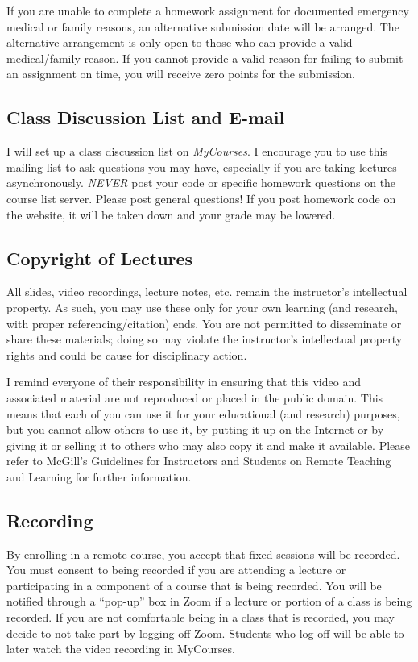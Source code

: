 \documentclass[11pt]{article}
\begin{document}
If you are unable to complete a homework assignment for documented emergency medical or family reasons, an alternative submission date will be arranged. The alternative arrangement is only open to those who can provide a valid medical/family reason. If you cannot provide a valid reason for failing to submit an assignment on time, you will receive zero points for the submission.

\subsection*{Class Discussion List and E-mail}

I will set up a class discussion list on \emph{MyCourses}. I encourage
you to use this mailing list to ask questions you may have, especially if you are taking lectures asynchronously. \emph{NEVER}
post your code or specific homework questions on the course list server.
Please post general questions! If you post homework code on the website,
it will be taken down and your grade may be lowered.

\subsection*{Copyright of Lectures}

All slides, video recordings, lecture notes, etc. remain the instructor’s intellectual property. As such, you may use these only for your own learning (and research, with proper referencing/citation) ends. You are not permitted to disseminate or share these materials; doing so may violate the instructor’s intellectual property rights and could be cause for disciplinary action.

I remind everyone of their responsibility in ensuring that this video and associated material are not reproduced or placed in the public domain. This means that each of you can use it for your educational (and research) purposes, but you cannot allow others to use it, by putting it up on the Internet or by giving it or selling it to others who may also copy it and make it available. Please refer to McGill’s Guidelines for Instructors and Students on Remote Teaching and Learning for further information. 

\subsection*{Recording}

By enrolling in a remote course, you accept that fixed sessions will be recorded. You must consent to being recorded if you are attending a lecture or participating in a component of a course that is being recorded. You will be notified through a “pop-up” box in Zoom if a lecture or portion of a class is being recorded. If you are not comfortable being in a class that is recorded, you may decide to not take part by logging off Zoom. Students who log off will be able to later watch the video recording in MyCourses.
\end{document}
